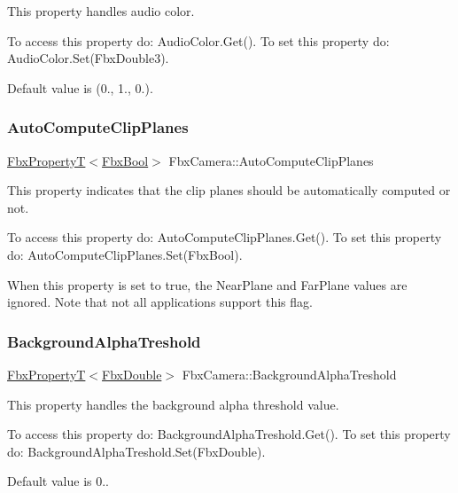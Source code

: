This property handles audio color.

To access this property do\+: Audio\+Color.\+Get(). To set this property do\+: Audio\+Color.\+Set(\+Fbx\+Double3).

Default value is (0., 1., 0.). \mbox{\label{class_fbx_camera_a416ffa14cbcdc07b2559bbbed7371d75}} 
\subsubsection{\texorpdfstring{Auto\+Compute\+Clip\+Planes}{AutoComputeClipPlanes}}
{\footnotesize\ttfamily \hyperlink{class_fbx_property_t}{Fbx\+PropertyT}$<$\hyperlink{fbxtypes_8h_a92e0562b2fe33e76a242f498b362262e}{Fbx\+Bool}$>$ Fbx\+Camera\+::\+Auto\+Compute\+Clip\+Planes}

This property indicates that the clip planes should be automatically computed or not.

To access this property do\+: Auto\+Compute\+Clip\+Planes.\+Get(). To set this property do\+: Auto\+Compute\+Clip\+Planes.\+Set(\+Fbx\+Bool).

When this property is set to true, the Near\+Plane and Far\+Plane values are ignored. Note that not all applications support this flag. \mbox{\label{class_fbx_camera_adee33826ef47ba5fc4719c78b6e5d582}} 
\subsubsection{\texorpdfstring{Background\+Alpha\+Treshold}{BackgroundAlphaTreshold}}
{\footnotesize\ttfamily \hyperlink{class_fbx_property_t}{Fbx\+PropertyT}$<$\hyperlink{fbxtypes_8h_a171e72a1c46fc15c1a6c9c31948c1c5b}{Fbx\+Double}$>$ Fbx\+Camera\+::\+Background\+Alpha\+Treshold}

This property handles the background alpha threshold value.

To access this property do\+: Background\+Alpha\+Treshold.\+Get(). To set this property do\+: Background\+Alpha\+Treshold.\+Set(\+Fbx\+Double).

Default value is 0.. \mbox{\label{class_fbx_camera_af50cc9dbfa39096cc1b9535e1b47d1d6}} 
